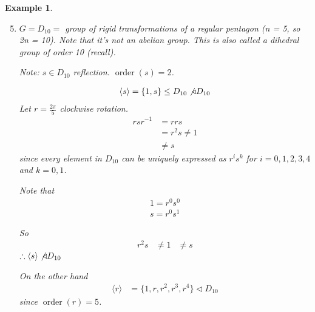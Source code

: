 \documentclass[11pt, oneside]{book}
\theoremstyle{break}
\newtheorem{eg}{Example}[section]
\DeclareMathOperator{\order}{order}
\begin{document}
\begin{eg}
    \begin{enumerate}
        \setcounter{enumi}{4}
        \item $G = D_{10} = $ group of rigid transformations of a regular pentagon (n = 5, so 2n = 10). Note that it's not an abelian group. This is also called a dihedral group of order 10 (recall).

            Note: $s \in D_{10}$ reflection. $\order(s) = 2$.

            \begin{align*}
                \langle s \rangle = \{1, s\} \leq D_{10} \not\triangleleft D_{10}
            \end{align*}
            Let $r = \frac{2 \pi}{5}$ clockwise rotation.
            \begin{align*}
                rsr^{-1} &= rrs \\
                    &= r^2 s \neq 1 \\
                    &\neq s
            \end{align*}
            since every element in $D_{10}$ can be uniquely expressed as $r^i s^k$ for $i = 0, 1, 2, 3, 4$ and $k = 0, 1$.

            Note that
            \begin{gather*}
                1 = r^0 s^0 \\
                s = r^0 s^1
            \end{gather*}

            So
            \begin{align*}
                r^2s &\neq 1
                    &\neq s
            \end{align*}
            $\therefore \langle s \rangle \not\triangleleft D_{10}$

            On the other hand
            \begin{align*}
                \langle r \rangle &= \{1, r, r^2, r^3, r^4 \} \triangleleft D_{10}
            \end{align*}
            since $\order(r) = 5$.


\end{enumerate}
\end{eg}
\end{document}
